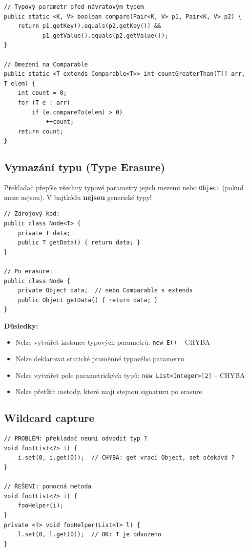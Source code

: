 \documentclass[11pt,a4paper]{article}
\begin{document}
\begin{verbatim}
// Typový parametr před návratovým typem
public static <K, V> boolean compare(Pair<K, V> p1, Pair<K, V> p2) {
    return p1.getKey().equals(p2.getKey()) &&
           p1.getValue().equals(p2.getValue());
}

// Omezení na Comparable
public static <T extends Comparable<T>> int countGreaterThan(T[] arr, T elem) {
    int count = 0;
    for (T e : arr)
        if (e.compareTo(elem) > 0)
            ++count;
    return count;
}
\end{verbatim}

\subsection{Vymazání typu (Type Erasure)}

\begin{tcolorbox}[defbox,title=Co je type erasure?]
Překladač přepíše všechny typové parametry jejich mezemi nebo \texttt{Object} (pokud meze nejsou). V bajtkódu \textbf{nejsou} generické typy!
\end{tcolorbox}

\begin{verbatim}
// Zdrojový kód:
public class Node<T> {
    private T data;
    public T getData() { return data; }
}

// Po erasure:
public class Node {
    private Object data;  // nebo Comparable s extends
    public Object getData() { return data; }
}
\end{verbatim}

\textbf{Důsledky:}
\begin{itemize}
    \item Nelze vytvářet instance typových parametrů: \texttt{new E()} -- CHYBA
    \item Nelze deklarovat statické proměnné typového parametru
    \item Nelze vytvářet pole parametrických typů: \texttt{new List<Integer>[2]} -- CHYBA
    \item Nelze přetížit metody, které mají stejnou signaturu po erasure
\end{itemize}

\subsection{Wildcard capture}

\begin{verbatim}
// PROBLÉM: překladač neumí odvodit typ ?
void foo(List<?> i) {
    i.set(0, i.get(0));  // CHYBA: get vrací Object, set očekává ?
}

// ŘEŠENÍ: pomocná metoda
void foo(List<?> i) {
    fooHelper(i);
}
private <T> void fooHelper(List<T> l) {
    l.set(0, l.get(0));  // OK: T je odvozeno
}
\end{verbatim}
\end{document}
